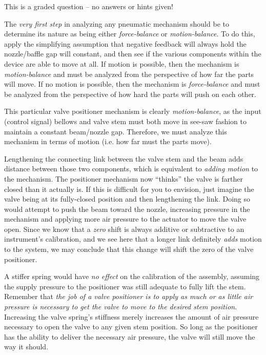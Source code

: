 \vfil 

\eject






This is a graded question -- no answers or hints given!







The {\it very first step} in analyzing any pneumatic mechanism should be to determine its nature as being either {\it force-balance} or {\it motion-balance}.  To do this, apply the simplifying assumption that negative feedback will always hold the nozzle/baffle gap will constant, and then see if the various components within the device are able to move at all.  If motion is possible, then the mechanism is {\it motion-balance} and must be analyzed from the perspective of how far the parts will move.  If no motion is possible, then the mechanism is {\it force-balance} and must be analyzed from the perspective of how hard the parts will push on each other.

This particular valve positioner mechanism is clearly {\it motion-balance}, as the input (control signal) bellows and valve stem must both move in see-saw fashion to maintain a constant beam/nozzle gap.  Therefore, we must analyze this mechanism in terms of motion (i.e. how far must the parts move).

\vskip 10pt

Lengthening the connecting link between the valve stem and the beam adds distance between those two components, which is equivalent to {\it adding motion} to the mechanism.  The positioner mechanism now ``thinks'' the valve is farther closed than it actually is.  If this is difficult for you to envision, just imagine the valve being at its fully-closed position and then lengthening the link.  Doing so would attempt to push the beam toward the nozzle, increasing pressure in the mechanism and applying more air pressure to the actuator to move the valve open.  Since we know that a {\it zero} shift is always additive or subtractive to an instrument's calibration, and we see here that a longer link definitely {\it adds} motion to the system, we may conclude that this change will shift the zero of the valve positioner.

\vskip 10pt

A stiffer spring would have {\it no effect} on the calibration of the assembly, assuming the supply pressure to the positioner was still adequate to fully lift the stem.  Remember that {\it the job of a valve positioner is to apply as much or as little air pressure is necessary to get the valve to move to the desired stem position}.  Increasing the valve spring's stiffness merely increases the amount of air pressure necessary to open the valve to any given stem position.  So long as the positioner has the ability to deliver the necessary air pressure, the valve will still move the way it should.

